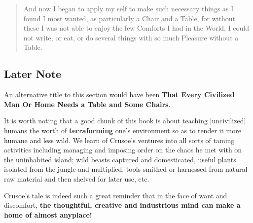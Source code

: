 \documentclass[a4paper]{article}
\begin{document}
\noindent
\begin{minipage}{1\textwidth}
\vspace{1em}
\begin{quotation}
{\ttfamily


And now I began to apply my self to make such necessary things as I found I most wanted, as particularly a Chair and a Table, for without these I was not able to enjoy the few Comforts I had in the World, I could not write, or eat, or do several things with so much Pleasure without a Table.


}
\end{quotation}
\vspace{1em}
\end{minipage}



\subsection{Later Note}

An alternative title to this section would have been \textbf{That Every Civilized Man Or Home Needs a Table and Some Chairs}.

It is worth noting that a good chunk of this book is about teaching [uncivilized] humans the worth of \textbf{terraforming} one's environment so as to render it more humane and less wild. We learn of Crusoe's ventures into all sorts of taming activities including managing and imposing order on the chaos he met with on the uninhabited island; wild beasts captured and domesticated, useful plants isolated from the jungle and multiplied, tools smithed or harnessed from natural raw material and then shelved for later use, etc.

Crusoe's tale is indeed such a great reminder that in the face of want and discomfort, \textbf{the thoughtful, creative and industrious mind can make a home of almost anyplace!} 
\end{document}
